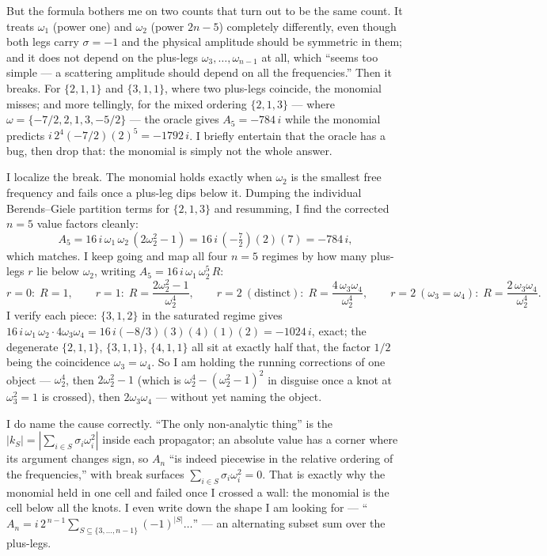 \documentclass{article}
\begin{document}
But the formula bothers me on two counts that turn out to be the same count. It
treats $\omega_1$ (power one) and $\omega_2$ (power $2n-5$) completely
differently, even though both legs carry $\sigma=-1$ and the physical amplitude
should be symmetric in them; and it does not depend on the plus-legs
$\omega_3,\dots,\omega_{n-1}$ at all, which ``seems too simple --- a scattering
amplitude should depend on all the frequencies.'' Then it breaks. For
$\{2,1,1\}$ and $\{3,1,1\}$, where two plus-legs coincide, the monomial misses;
and more tellingly, for the mixed ordering $\{2,1,3\}$ --- where
$\omega=\{-7/2,2,1,3,-5/2\}$ --- the oracle gives $A_5=-784\,i$ while the monomial
predicts $i\,2^4(-7/2)(2)^5=-1792\,i$. I briefly entertain that the oracle has a
bug, then drop that: the monomial is simply not the whole answer.

I localize the break. The monomial holds exactly when $\omega_2$ is the smallest
free frequency and fails once a plus-leg dips below it. Dumping the individual
Berends--Giele partition terms for $\{2,1,3\}$ and resumming, I find the corrected
$n=5$ value factors cleanly:
\[
A_5 = 16\,i\,\omega_1\,\omega_2\,(2\omega_2^2-1)=16\,i\,(-\tfrac72)(2)(7)=-784\,i,
\]
which matches. I keep going and map all four $n=5$ regimes by how many plus-legs
$r$ lie below $\omega_2$, writing $A_5=16\,i\,\omega_1\,\omega_2^5\,R$:
\[
r=0:\;R=1,\qquad
r=1:\;R=\frac{2\omega_2^2-1}{\omega_2^4},\qquad
r=2\ (\text{distinct}):\;R=\frac{4\,\omega_3\omega_4}{\omega_2^4},\qquad
r=2\ (\omega_3=\omega_4):\;R=\frac{2\,\omega_3\omega_4}{\omega_2^4}.
\]
I verify each piece: $\{3,1,2\}$ in the saturated regime gives
$16\,i\,\omega_1\,\omega_2\cdot4\omega_3\omega_4=16\,i(-8/3)(3)(4)(1)(2)=-1024\,i$,
exact; the degenerate $\{2,1,1\}$, $\{3,1,1\}$, $\{4,1,1\}$ all sit at exactly
half that, the factor $1/2$ being the coincidence $\omega_3=\omega_4$. So I am
holding the running corrections of one object --- $\omega_2^4$, then
$2\omega_2^2-1$ (which is $\omega_2^4-(\omega_2^2-1)^2$ in disguise once a knot at
$\omega_3^2=1$ is crossed), then $2\omega_3\omega_4$ --- without yet naming the
object.

I do name the cause correctly. ``The only non-analytic thing'' is the
$|k_S|=|\sum_{i\in S}\sigma_i\omega_i^2|$ inside each propagator; an absolute value
has a corner where its argument changes sign, so $A_n$ ``is indeed piecewise in
the relative ordering of the frequencies,'' with break surfaces
$\sum_{i\in S}\sigma_i\omega_i^2=0$. That is exactly why the monomial held in one
cell and failed once I crossed a wall: the monomial is the cell below all the
knots. I even write down the shape I am looking for ---
``$A_n=i\,2^{\,n-1}\sum_{S\subseteq\{3,\dots,n-1\}}(-1)^{|S|}\dots$'' --- an
alternating subset sum over the plus-legs.
\end{document}
